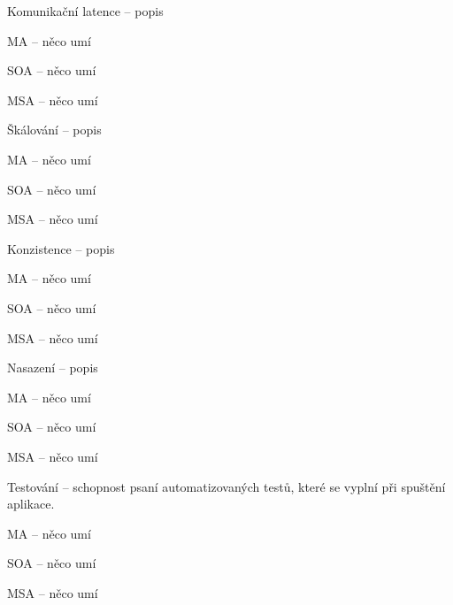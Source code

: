 \begin{dl}
   \item[Komunikační latence] – popis
\end{dl}
\begin{ul}
   \item \gls{MA} – něco umí
   \item \gls{SOA} – něco umí
   \item \gls{MSA} – něco umí
\end{ul}

\begin{dl}
   \item[Škálování] – popis
\end{dl}
\begin{ul}
   \item \gls{MA} – něco umí
   \item \gls{SOA} – něco umí
   \item \gls{MSA} – něco umí
\end{ul}

\begin{dl}
   \item[Konzistence] – popis
\end{dl}
\begin{ul}
   \item \gls{MA} – něco umí
   \item \gls{SOA} – něco umí
   \item \gls{MSA} – něco umí
\end{ul}

\begin{dl}
   \item[Nasazení] – popis
\end{dl}
\begin{ul}
   \item \gls{MA} – něco umí
   \item \gls{SOA} – něco umí
   \item \gls{MSA} – něco umí
\end{ul}

\begin{dl}
   \item[Testování] – schopnost psaní automatizovaných testů, které se vyplní při spuštění aplikace.
\end{dl}
\begin{ul}
   \item \gls{MA} – něco umí
   \item \gls{SOA} – něco umí
   \item \gls{MSA} – něco umí
\end{ul}
